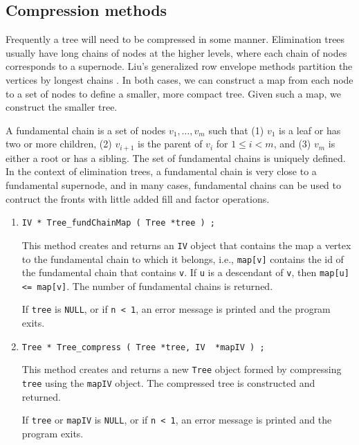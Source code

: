 \subsection{Compression methods}
\label{subsection:Tree:proto:compression}
\par
Frequently a tree will need to be compressed in some manner.
Elimination trees usually have long chains of nodes at the higher
levels, where each chain of nodes corresponds to a supernode.
Liu's generalized row envelope methods partition the vertices by
longest chains \cite{liu91-generalizedEnvelope}.
In both cases, we can construct a map from each node to a set of 
nodes to define a smaller, more compact tree.
Given such a map, we construct the smaller tree.
\par
A fundamental chain is a set of nodes $v_1, \ldots, v_m$ such that
(1) $v_1$ is a leaf or has two or more children,
(2) $v_{i+1}$ is the parent of $v_i$ for $1 \le i < m$,
and 
(3) $v_m$ is either a root or has a sibling.
The set of fundamental chains is uniquely defined.
In the context of elimination trees, a fundamental chain is very
close to a fundamental supernode, and in many cases, 
fundamental chains can be used to contruct the fronts with little 
added fill and factor operations.
\begin{enumerate}
\item
\begin{verbatim}
IV * Tree_fundChainMap ( Tree *tree ) ;
\end{verbatim}
This method creates and returns an {\tt IV} object that contains
the map a vertex to the fundamental chain to which it belongs,
i.e., {\tt map[v]} contains the id of the fundamental chain
that contains {\tt v}.
If {\tt u} is a descendant of {\tt v}, then {\tt map[u] <=
map[v]}.
The number of fundamental chains is returned.
\par {}
If {\tt tree} is {\tt NULL}, 
or if {\tt n < 1},
an error message is printed and the program exits.
\item
\begin{verbatim}
Tree * Tree_compress ( Tree *tree, IV  *mapIV ) ;
\end{verbatim}
This method creates and returns a new {\tt Tree} object
formed by compressing {\tt tree} using the {\tt mapIV} object.
The compressed tree is constructed and returned.
\par {}
If {\tt tree} or {\tt mapIV} is {\tt NULL}, 
or if {\tt n < 1},
an error message is printed and the program exits.
\end{enumerate}
\par
